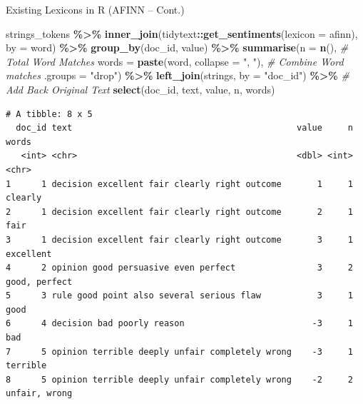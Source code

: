 \documentclass[
  ignorenonframetext,
  aspectratio=169]{beamer}
\newenvironment{Shaded}{\begin{snugshade}}{\end{snugshade}}
\newcommand{\AttributeTok}[1]{\textcolor[rgb]{0.13,0.29,0.53}{#1}}
\newcommand{\CommentTok}[1]{\textcolor[rgb]{0.56,0.35,0.01}{\textit{#1}}}
\newcommand{\FunctionTok}[1]{\textcolor[rgb]{0.13,0.29,0.53}{\textbf{#1}}}
\newcommand{\NormalTok}[1]{#1}
\newcommand{\SpecialCharTok}[1]{\textcolor[rgb]{0.81,0.36,0.00}{\textbf{#1}}}
\newcommand{\StringTok}[1]{\textcolor[rgb]{0.31,0.60,0.02}{#1}}
\begin{document}
\begin{frame}[fragile]{Existing Lexicons in R (AFINN -- Cont.)}
\label{existing-lexicons-in-r-afinn-cont.-1}
\scriptsize

\begin{Shaded}
\begin{Highlighting}[]
\NormalTok{strings\_tokens }\SpecialCharTok{\%\textgreater{}\%}
  \FunctionTok{inner\_join}\NormalTok{(tidytext}\SpecialCharTok{::}\FunctionTok{get\_sentiments}\NormalTok{(}\AttributeTok{lexicon =} \StringTok{\textquotesingle{}afinn\textquotesingle{}}\NormalTok{), }\AttributeTok{by =} \StringTok{\textquotesingle{}word\textquotesingle{}}\NormalTok{) }\SpecialCharTok{\%\textgreater{}\%}
  \FunctionTok{group\_by}\NormalTok{(doc\_id, value) }\SpecialCharTok{\%\textgreater{}\%}
  \FunctionTok{summarise}\NormalTok{(}\AttributeTok{n =} \FunctionTok{n}\NormalTok{(), }\CommentTok{\# Total Word Matches}
            \AttributeTok{words =} \FunctionTok{paste}\NormalTok{(word, }\AttributeTok{collapse =} \StringTok{", "}\NormalTok{), }\CommentTok{\# Combine Word matches}
            \AttributeTok{.groups =} \StringTok{"drop"}\NormalTok{) }\SpecialCharTok{\%\textgreater{}\%}
  \FunctionTok{left\_join}\NormalTok{(strings, }\AttributeTok{by =} \StringTok{"doc\_id"}\NormalTok{) }\SpecialCharTok{\%\textgreater{}\%} \CommentTok{\# Add Back Original Text}
  \FunctionTok{select}\NormalTok{(doc\_id, text, value, n, words)}
\end{Highlighting}
\end{Shaded}

\begin{verbatim}
# A tibble: 8 x 5
  doc_id text                                            value     n words        
   <int> <chr>                                           <dbl> <int> <chr>        
1      1 decision excellent fair clearly right outcome       1     1 clearly      
2      1 decision excellent fair clearly right outcome       2     1 fair         
3      1 decision excellent fair clearly right outcome       3     1 excellent    
4      2 opinion good persuasive even perfect                3     2 good, perfect
5      3 rule good point also several serious flaw           3     1 good         
6      4 decision bad poorly reason                         -3     1 bad          
7      5 opinion terrible deeply unfair completely wrong    -3     1 terrible     
8      5 opinion terrible deeply unfair completely wrong    -2     2 unfair, wrong
\end{verbatim}
\end{frame}
\end{document}

